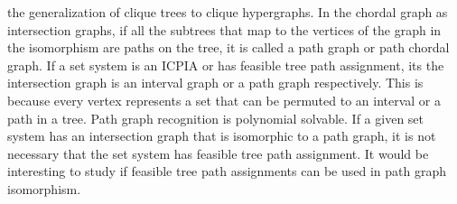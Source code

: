 \documentclass{llncs}
\def\cH{{\cal H}}
\def\F{{\mathcal F}}
\begin{document}
the generalization of clique trees to clique
hypergraphs\cite{km02}. In the chordal graph as intersection graphs,
if all the subtrees that map to the vertices of the graph in the
isomorphism are paths on the tree, it is called a path
graph\cite{mcg04} or path chordal graph.  If a set system is an ICPIA
or has feasible tree path assignment, its the intersection graph is an
interval graph or a path graph respectively. This is because every
vertex represents a set that can be permuted to an interval or a path
in a tree. Path graph recognition is polynomial
solvable\cite{gav78,aas93}. If a given set system has an intersection
graph that is isomorphic to a path graph, it is not necessary that the
set system has feasible tree path assignment. It would be interesting
to study if feasible tree path assignments can be used in path graph
isomorphism.






\end{document}
